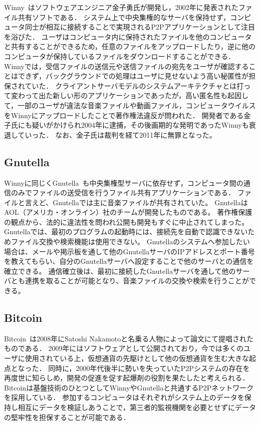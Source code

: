Winny~\cite{Winny}はソフトウェアエンジニア金子勇氏が開発し，2002年に発表されたファイル共有ソフトである．
システム上で中央集権的なサーバを保持せず，コンピュータ同士が相互に接続することで実現されるP2Pアプリケーションとして注目を浴びた．
ユーザはコンピュータ内に保持されたファイルを他のコンピュータと共有することができるため，任意のファイルをアップロードしたり，逆に他のコンピュータが保持しているファイルをダウンロードすることができる．
Winnyでは，受信ファイルの送信元や送信ファイルの宛先をユーザが確認することはできず，バックグラウンドでの処理はユーザに見せないよう高い秘匿性が担保されていた．
クライアントサーバモデルのシステムアーキテクチャとは打って変わって出た新しい形のアプリケーションであったが，高い匿名性も起因して，一部のユーザが違法な音楽ファイルや動画ファイル，コンピュータウイルスをWinnyにアップロードしたことで著作権法違反が問われた．
開発者である金子氏にも疑いがかけられ2004年に逮捕，その後画期的な発明であったWinnyも衰退していった．
なお、金子氏は裁判を経て2011年に無罪となった。

\subsection{Gnutella}

Winnyに同じくGnutella~\cite{Gnutella}も中央集権型サーバに依存せず，コンピュータ間の通信のみでファイルの送受信を行うファイル共有アプリケーションである．
ファイルと言えど、Gnutellaでは主に音楽ファイルが共有されていた。
GnutellaはAOL（アメリカ・オンライン）社のチームが開発したものである。
著作権保護の観点から、法的に違法性を問われ公開も開発もすぐに中止されてしまった。
Gnutellaでは、最初のプログラムの起動時には、接続先を自動で認識できないためファイル交換や検索機能は使用できない。
Gnutellaのシステムへ参加したい場合は、メールや掲示板を通して他のGnutellaサーバのIPアドレスとポート番号を教えてもらい、自分のGnutellaサーバへ設定することで他のサーバとの通信を確立できる。
通信確立後は、最初に接続したGnutellaサーバを通して他のサーバとも連携を取ることが可能となり、音楽ファイルの交換や検索を行うことができる。

\subsection{Bitcoin}

Bitcoin~\cite{Bitcoin}は2008年にSatoshi Nakamotoと名乗る人物によって論文にて提唱されたものである．
2009年にはソフトウェアとして公開されており，今では多くのユーザに使用されている上，仮想通貨の先駆けとして他の仮想通貨を生む大きな起点となった．
同時に，2000年代後半に勢いを失っていたP2Pシステムの存在を再度世に知らしめ，開発の促進を促す起爆剤の役割を果たしたと考えられる．
Bitcoinは基盤技術のひとつとしてWinnyやGnutellaと共通するP2Pネットワークを採用している．
参加するコンピュータはそれぞれがシステム上のデータを保持し相互にデータを検証しあうことで，第三者的監視機関を必要とせずにデータの堅牢性を担保することが可能である．

